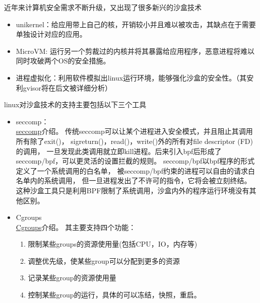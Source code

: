 \documentclass[AutoFakeBold,a4paper]{ctexart}
\begin{document}
\item 近年来计算机安全需求不断升级，又出现了很多新兴的沙盒技术
\begin{itemize}
    \item unikernel：给应用带上自己的核，开销较小并且难以被攻击，其缺点在于需要单独设计对应的应用。
    \item MicroVM: 运行另一个剪裁过的内核并将其暴露给应用程序，恶意进程将难以同时攻破两个OS的安全措施。
    \item 进程虚拟化：利用软件模拟出linux运行环境，能够强化沙盒的安全性。（其安利gvisor将在后文被详细分析）
\end{itemize}

\item linux对沙盒技术的支持主要包括以下三个工具
\begin{itemize}
    \item seccomp：\\
    \href{https://en.wikipedia.org/wiki/Seccomp}{seccomp}介绍。
    传统seccomp可以让某个进程进入安全模式，并且阻止其调用所有除了exit()，
    sigreturn()，read()，write()外的所有对file descriptor (FD) 的调用，
    一旦发现此类调用就立即kill进程。后来引入bpf后形成了seccomp/bpf，可以更灵活的设置拦截的规则。
    seccomp/bpf以bpf程序的形式定义了一个系统调用的白名单，
    被seccomp/bpf约束的进程可以自由的请求白名单内的系统调用，
    但一旦进程发出了不许可的指令，它将会被立刻终结。
    这种沙盒工具只是利用BPF限制了系统调用，沙盒内外的程序运行环境没有其他区别。
    \cite{2020SandboxLinux}

    \item Cgroups\\
    \href{https://en.wikipedia.org/wiki/Cgroups}{Cgroups}介绍。
    其主要支持四个功能：
    \begin{enumerate}
        \item 限制某些groups的资源使用量(包括CPU，IO，内存等)
        \item 调整优先级，使某些group可以分配到更多的资源
        \item 记录某些group的资源使用量
        \item 控制某些group的运行，具体的可以冻结，快照，重启。
    \end{enumerate}


\end{itemize}
\end{document}
